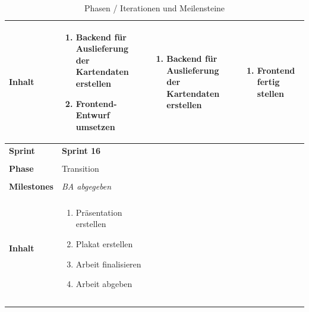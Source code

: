 \begin{landscape}
\begin{longtable}{l p{6.5cm} p{6.5cm} p{6.5cm}}
        \textbf{Inhalt}
                                & \begin{enumerate}[noitemsep]
                                    \item Backend für Auslieferung der Kartendaten erstellen
                                    \item Frontend-Entwurf umsetzen
                                \end{enumerate}
                                & \begin{enumerate}[noitemsep]
                                    \item Backend für Auslieferung der Kartendaten erstellen
                                \end{enumerate}
                                & \begin{enumerate}[noitemsep]
                                    \item Frontend fertig stellen
                                \end{enumerate}\\

        \toprule
        \textbf{Sprint}
                                & \textbf{Sprint 16}
                                & \\
                                & \\

        \midrule
        \textbf{Phase}
                                & Transition
                                & \\
                                & \\

        \textbf{Milestones}
                                & \textit{BA abgegeben}
                                & \\
                                &  \\

        \textbf{Inhalt}
                                & \begin{enumerate}[noitemsep]
                                    \item Präsentation erstellen
                                    \item Plakat erstellen
                                    \item Arbeit finalisieren
                                    \item Arbeit abgeben

                                \end{enumerate}
                                & \\
                                & \\
        \bottomrule
    \caption{Phasen / Iterationen und Meilensteine}
    \label{table:Phasen / Iterationen und Meilensteine}
\end{longtable}
\end{landscape}

